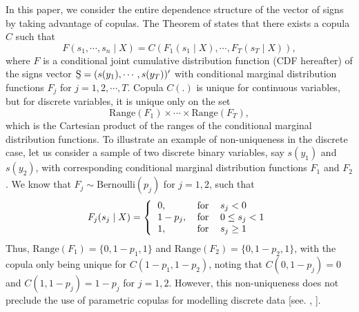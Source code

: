 \documentclass[harvard,11pt]{article}
\begin{document}
In this paper, we consider the entire dependence structure of the vector of signs by taking advantage of copulas. The Theorem of  \citet{sklar1959fonctions} states that there exists a copula $C$ such that
\begin{equation}
F(s_1,\cdots,s_n\mid X)=C(F_1(s_1\mid X),\cdots,F_T(s_T\mid X)),
\end{equation}
where $F$ is a conditional joint cumulative distribution function (CDF hereafter) of the signs vector $\text{\b{S}}=(s(y_1),\cdots,s(y_T))'$ with conditional marginal distribution functions $F_j$ for $j=1,2,\cdots,T$. Copula $C(.)$ is unique for continuous variables, but for discrete variables, it is unique only on the set
\[
\text{Range}(F_1)\times\cdots\times\text{Range}(F_T),
\]
which is the Cartesian product of the ranges of the conditional marginal distribution functions. To illustrate an example of non-uniqueness in the discrete case, let us consider a sample of two discrete binary variables, say $s(y_1)$ and $s(y_2)$, with corresponding conditional marginal distribution functions $F_1$ and $F_2$. We know that $F_j\sim\text{Bernoulli}(p_j)$ for $j=1,2$, such that
\begin{equation}\label{eq: BernoulliCDF}
F_j(s_j\mid X)=\left\{ 
\begin{tabular}{lll}
$0,$ &$\text{for}$& $s_j< 0$ \\ 
$1-p_j,$ &$\text{for}$ &$0\leq s_j< 1$ \\
$1,$& $\text{for}$& $s_j\geq 1$
\end{tabular}%
\right.
\end{equation} 
Thus, $\text{Range}(F_1)=\{0,1-p_1,1\}$ and $\text{Range}(F_2)=\{0,1-p_2,1\}$, with the copula only being unique for $C(1-p_1,1-p_2)$, noting that $C(0,1-p_j)=0$ and $C(1,1-p_j)=1-p_j$ for $j=1,2$. However, this non-uniqueness does not preclude the use of parametric copulas for modelling discrete data [see. \citet{joe1997multivariate}, \citet{song2009joint}]. 
\end{document}

